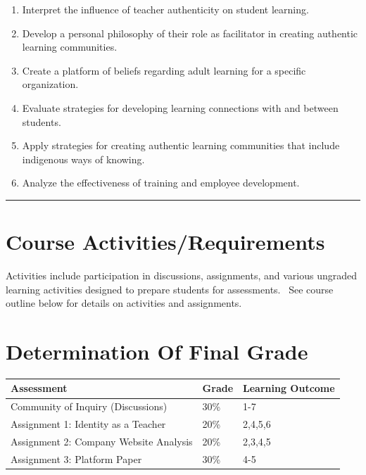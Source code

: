 \documentclass[
]{book}
\begin{document}
\begin{enumerate}
\def\labelenumi{\arabic{enumi}.}
\item
  Interpret the influence of teacher authenticity on student learning.
\item
  Develop a personal philosophy of their role as facilitator in creating authentic learning communities.
\item
  Create a platform of beliefs regarding adult learning for a specific organization.
\item
  Evaluate strategies for developing learning connections with and between students.
\item
  Apply strategies for creating authentic learning communities that include indigenous ways of knowing.
\item
  Analyze the effectiveness of training and employee development.
\end{enumerate}

\begin{center}\rule{0.5\linewidth}{0.5pt}\end{center}

\hypertarget{course-activitiesrequirements}{%
\section*{Course Activities/Requirements}\label{course-activitiesrequirements}}

Activities include participation in discussions, assignments, and various ungraded learning activities designed to prepare students for assessments.~ See course outline below for details on activities and assignments.

\hypertarget{determination-of-final-grade}{%
\section*{Determination Of Final Grade}\label{determination-of-final-grade}}

\begin{longtable}[]{@{}lll@{}}
\toprule
\textbf{Assessment} & \textbf{Grade} & Learning Outcome \\
\midrule
\endhead
Community of Inquiry (Discussions) & 30\% & 1-7 \\
Assignment 1: Identity as a Teacher~ & 20\% & 2,4,5,6 \\
Assignment 2: Company Website Analysis & 20\% & 2,3,4,5 \\
Assignment 3: Platform Paper & 30\% & 4-5 \\
\bottomrule
\end{longtable}
\end{document}
